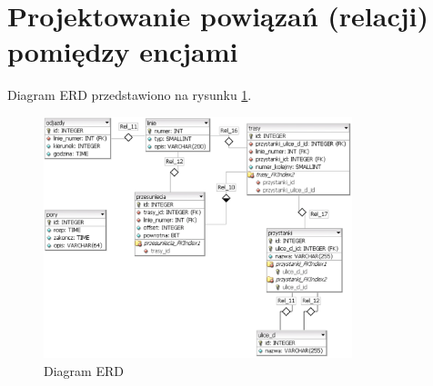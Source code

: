 \section{Projektowanie powiązań (relacji) pomiędzy encjami}


Diagram ERD przedstawiono na rysunku \ref{fig:erd}.

\begin{figure}[!htp]
    \centering
    \includegraphics[width=0.8\textwidth]{./img/erd.eps}
    \caption{Diagram ERD}
    \label{fig:erd}
\end{figure}

